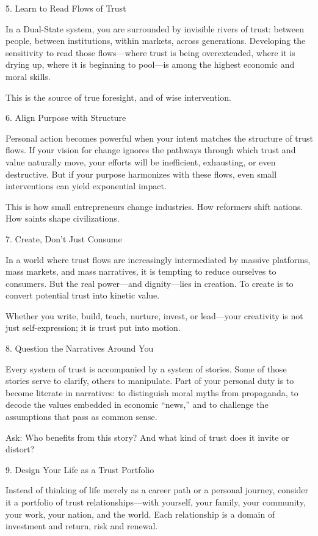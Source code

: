\documentclass[11pt,oneside]{book}
\begin{document}
5. Learn to Read Flows of Trust


In a Dual-State system, you are surrounded by invisible rivers of trust: between people, between institutions, within markets, across generations. Developing the sensitivity to read those flows—where trust is being overextended, where it is drying up, where it is beginning to pool—is among the highest economic and moral skills.

This is the source of true foresight, and of wise intervention.

6. Align Purpose with Structure


Personal action becomes powerful when your intent matches the structure of trust flows. If your vision for change ignores the pathways through which trust and value naturally move, your efforts will be inefficient, exhausting, or even destructive. But if your purpose harmonizes with these flows, even small interventions can yield exponential impact.

This is how small entrepreneurs change industries. How reformers shift nations. How saints shape civilizations.

7. Create, Don’t Just Consume


In a world where trust flows are increasingly intermediated by massive platforms, mass markets, and mass narratives, it is tempting to reduce ourselves to consumers. But the real power—and dignity—lies in creation. To create is to convert potential trust into kinetic value.

Whether you write, build, teach, nurture, invest, or lead—your creativity is not just self-expression; it is trust put into motion.

8. Question the Narratives Around You


Every system of trust is accompanied by a system of stories. Some of those stories serve to clarify, others to manipulate. Part of your personal duty is to become literate in narratives: to distinguish moral myths from propaganda, to decode the values embedded in economic “news,” and to challenge the assumptions that pass as common sense.

Ask: Who benefits from this story? And what kind of trust does it invite or distort?

9. Design Your Life as a Trust Portfolio


Instead of thinking of life merely as a career path or a personal journey, consider it a portfolio of trust relationships—with yourself, your family, your community, your work, your nation, and the world. Each relationship is a domain of investment and return, risk and renewal.
\end{document}
